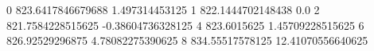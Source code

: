 0 823.6417846679688 1.497314453125
1 822.1444702148438 0.0
2 821.7584228515625 -0.38604736328125
4 823.6015625 1.45709228515625
6 826.92529296875 4.78082275390625
8 834.55517578125 12.41070556640625
